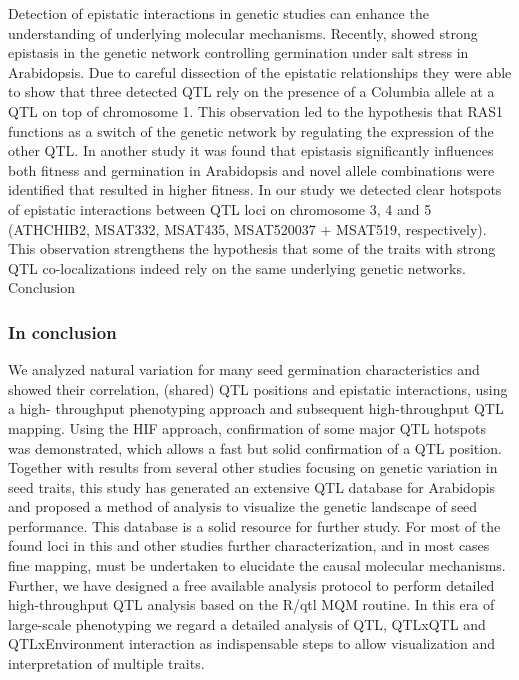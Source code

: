\documentclass[8pt, twoside, a5paper]{report}
\begin{document}
Detection of epistatic interactions in genetic studies can enhance the understanding of underlying molecular mechanisms. Recently, \cite{Galpaz:2010} showed strong epistasis 
in the genetic network controlling germination under salt stress in Arabidopsis. Due to careful dissection of the epistatic relationships they were able to show that three detected 
QTL rely on the presence of a Columbia allele at a QTL on top of chromosome 1. This observation led to the hypothesis that RAS1 \cite{Ren:2010} functions as a switch of the genetic 
network by regulating the expression of the other QTL. In another study it was found that epistasis significantly influences both fitness and germination in Arabidopsis \cite{Huang:2010} 
and novel allele combinations were identified that resulted in higher fitness. In our study we detected clear hotspots of epistatic interactions between QTL loci on chromosome 3, 4 and 5 (ATHCHIB2,
MSAT332, MSAT435, MSAT520037 + MSAT519, respectively). This observation strengthens the hypothesis that some of the traits with strong QTL co-localizations indeed rely on the same underlying genetic networks.
Conclusion

\subsubsection{In conclusion}
We analyzed natural variation for many seed germination characteristics and showed their correlation, (shared) QTL positions and epistatic interactions, using a high-
throughput phenotyping approach and subsequent high-throughput QTL mapping. Using the HIF approach, confirmation of some major QTL hotspots was demonstrated, which 
allows a fast but solid confirmation of a QTL position. Together with results from several other studies focusing on genetic variation in seed traits, this study has 
generated an extensive QTL database for Arabidopis and proposed a method of analysis to visualize the genetic landscape of seed performance. This database is a solid 
resource for further study. For most of the found loci in this and other studies further characterization, and in most cases fine mapping, must be undertaken to elucidate 
the causal molecular mechanisms. Further, we have designed a free available analysis protocol to perform detailed high-throughput QTL analysis based on the R/qtl MQM 
routine. In this era of large-scale phenotyping we regard a detailed analysis of QTL, QTLxQTL and QTLxEnvironment interaction as indispensable steps to allow visualization 
and interpretation of multiple traits.
\end{document}
